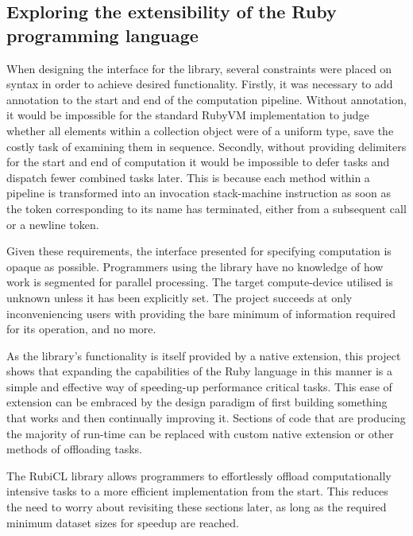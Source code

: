 \subsection{Exploring the extensibility of the Ruby programming language}
When designing the interface for the library, several constraints were placed on syntax in order to achieve desired functionality. Firstly, it was necessary to add annotation to the start and end of the computation pipeline. Without annotation, it would be impossible for the standard RubyVM implementation to judge whether all elements within a collection object were of a uniform type, save the costly task of examining them in sequence. Secondly, without providing delimiters for the start and end of computation it would be impossible to defer tasks and dispatch fewer combined tasks later. This is because each method within a pipeline is transformed into an invocation stack-machine instruction as soon as the token corresponding to its name has terminated, either from a subsequent call or a newline token.

Given these requirements, the interface presented for specifying computation is opaque as possible. Programmers using the library have no knowledge of how work is segmented for parallel processing. The target compute-device utilised is unknown unless it has been explicitly set. The project succeeds at only inconveniencing users with providing the bare minimum of information required for its operation, and no more.

As the library's functionality is itself provided by a native extension, this project shows that expanding the capabilities of the Ruby language in this manner is a simple and effective way of speeding-up performance critical tasks. This ease of extension can be embraced by the design paradigm of first building something that works and then continually improving it. Sections of code that are producing the majority of run-time can be replaced with custom native extension or other methods of offloading tasks.

The RubiCL library allows programmers to effortlessly offload computationally intensive tasks to a more efficient implementation from the start. This reduces the need to worry about revisiting these sections later, as long as the required minimum dataset sizes for speedup are reached.

